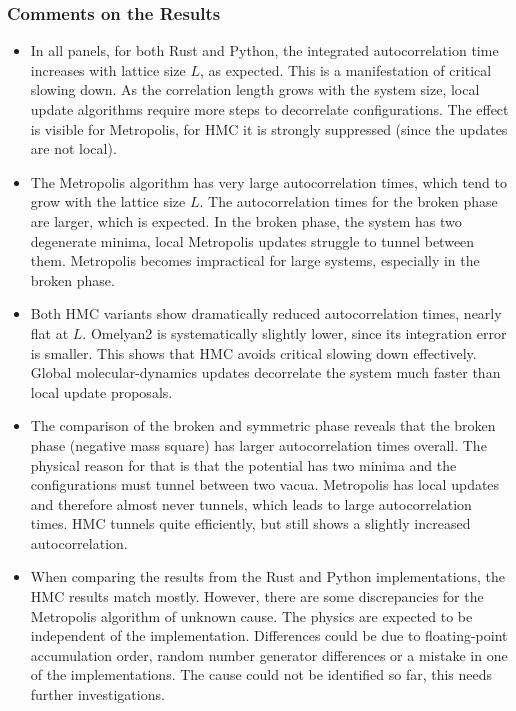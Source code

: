 \subsubsection*{Comments on the Results}
\begin{itemize}
    \item In all panels, for both Rust and Python, the integrated autocorrelation time increases with lattice size $L$, as expected. This is a manifestation of critical slowing down. As the correlation length grows with the system size, local update algorithms require more steps to decorrelate configurations. The effect is visible for Metropolis, for HMC it is strongly suppressed (since the updates are not local).
    \item The Metropolis algorithm has very large autocorrelation times, which tend to grow with the lattice size $L$. The autocorrelation times for the broken phase are larger, which is expected. In the broken phase, the system has two degenerate minima, local Metropolis updates struggle to tunnel between them. Metropolis becomes impractical for large systems, especially in the broken phase. 
    \item Both HMC variants show dramatically reduced autocorrelation times, nearly flat at $L$. Omelyan2 is systematically slightly lower, since its integration error is smaller. This shows that HMC avoids critical slowing down effectively. Global molecular-dynamics updates decorrelate the system much faster than local update proposals. 
    \item The comparison of the broken and symmetric phase reveals that the broken phase (negative mass square) has larger autocorrelation times overall. The physical reason for that is that the potential has two minima and the configurations must tunnel between two vacua. Metropolis has local updates and therefore almost never tunnels, which leads to large autocorrelation times. HMC tunnels quite efficiently, but still shows a slightly increased autocorrelation. 
    \item When comparing the results from the Rust and Python implementations, the HMC results match mostly. However, there are some discrepancies for the Metropolis algorithm of unknown cause. The physics are expected to be independent of the implementation. Differences could be due to floating-point accumulation order, random number generator differences or a mistake in one of the implementations. The cause could not be identified so far, this needs further investigations.  
\end{itemize}
